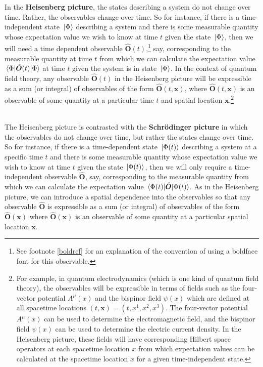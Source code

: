 In the \textbf{Heisenberg picture}, the states describing a system do not change over time. Rather, the observables change over time. So for instance, if there is a time-independent state $\ket*{\Phi}$ describing a system and there is some measurable quantity whose expectation value we wish to know at time $t$ given the state $\ket*{\Phi}$, then we will need a time dependent observable $\hat{\bm{O}}(t)$,\footnote{See footnote \ref{boldref} for an explanation of the convention of using a boldface font for this observable.} say, corresponding to the measurable quantity at time $t$ from which we can calculate the expectation value $\ev*{\hat{\bm{O}}(t)}{\Phi}$ at time $t$  given the system is in state $\ket*{\Phi}$. In the context of quantum field theory, any observable $\hat{\bm{O}}(t)$ in the Heisenberg picture will be expressible as a sum (or integral) of observables of the form $\hat{\bm{O}}(t, \bm{x})$, where $\hat{\bm{O}}(t, \bm{x})$ is an observable of some quantity at a particular time $t$ and spatial location $\bm{x}$.\footnote{For example, in quantum electrodynamics (which is one kind of quantum field theory), the observables will be expressible in terms of fields such as the four-vector potential $A^\mu(x)$ and the bispinor field $\psi(x)$ which are defined at all spacetime locations $(t, \bm{x})=(t, x^1, x^2, x^3)$. The four-vector potential $A^\mu(x)$ can be used to determine the electromagnetic field, and the bispinor field $\psi(x)$ can be used to determine the electric current density. In the Heisenberg picture, these fields will have corresponding Hilbert space operators at each spacetime location $x$ from which expectation values can be calculated at the spacetime location $x$ for a given time-independent state.}
\strut \\[\baselineskip]
The Heisenberg picture is contrasted with the \textbf{Schr\"{o}dinger picture} in which the observables do not change over time, but rather the states change over time. So for instance, if there is a time-dependent state $\ket*{\Phi(t)}$ describing a system at a specific time $t$ and there is some measurable quantity whose expectation value we wish to know at time $t$ given the state $\ket*{\Phi(t)}$, then we will only require a time-independent observable $\hat{\bm{O}}$, say, corresponding to the measurable quantity from which we can calculate the expectation value $\ev*{\hat{\bm{O}}}{\Phi(t)}$. As in the Heisenberg picture, we can introduce a spatial dependence into the observables so that any observable  $\hat{\bm{O}}$ is expressible as a sum (or integral) of observables of the form $\hat{\bm{O}}(\bm{x})$ where $\hat{\bm{O}}(\bm{x})$ is an observable of some quantity at a particular spatial location $\bm{x}$.
